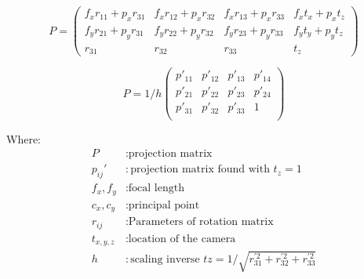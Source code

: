 \documentclass[11pt,a4paper,titlepage,oneside]{report}
\begin{document}
\begin{equation}\label{eq:ext_int}
	P=
	\begin{pmatrix}
		f_xr_{11}+p_xr_{31} & f_xr_{12}+p_xr_{32} & f_xr_{13}+p_xr_{33} & f_xt_x+p_xt_z\\
		f_yr_{21}+p_yr_{31} & f_yr_{22}+p_yr_{32} & f_yr_{23}+p_yr_{33} & f_yt_y+p_yt_z\\
		r_{31} & r_{32} & r_{33} & t_z
	\end{pmatrix}
\end{equation}

\begin{equation}\label{eq:ext_int_scaled}
	P=1/h
	\begin{pmatrix}
		p'_{11} & p'_{12} & p'_{13} & p'_{14}\\
		p'_{21} & p'_{22} & p'_{23} & p'_{24}\\
		p'_{31} & p'_{32} & p'_{33} & 1\\
	\end{pmatrix}
\end{equation}

Where:
\begin{align*}
	P					&: \text{projection matrix}\\
	p_{ij}'		&: \text{projection matrix found with $t_z=1$}\\
	f_x,f_y		&: \text{focal length}\\
	c_x,c_y		&: \text{principal point}\\
	r_{ij}		&: \text{Parameters of rotation matrix}\\
	t_{x,y,z}	&: \text{location of the camera}\\
	h					&: \text{scaling inverse $tz=1/\sqrt{r_{31}^{'2}+r_{32}^{'2}+r_{33}^{'2}}$}
\end{align*}
\end{document}
